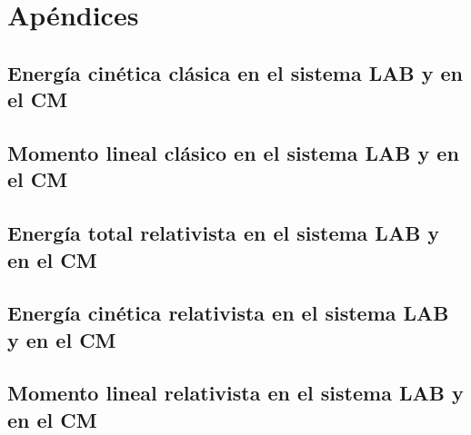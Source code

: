 \section{Apéndices}

\subsection{Energía cinética clásica en el sistema LAB y en el CM}

\subsection{Momento lineal clásico en el sistema LAB y en el CM}

\subsection{Energía total relativista en el sistema LAB y en el CM}

\subsection{Energía cinética relativista en el sistema LAB y en el CM}

\subsection{Momento lineal relativista en el sistema LAB y en el CM}


